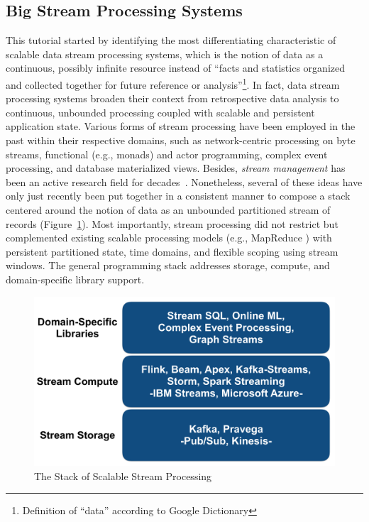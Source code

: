 
\subsection{Big Stream Processing Systems}
\label{sec:tut_systems}

This tutorial started by identifying the most differentiating characteristic of scalable data stream processing systems, which is the notion of data as a continuous, possibly infinite resource instead of ``facts and statistics organized and collected together for future reference or analysis''\footnote{Definition of ``data'' according to Google Dictionary}. In fact, data stream processing systems broaden their context from retrospective data analysis to continuous, unbounded processing coupled with scalable and persistent application state.  Various forms of stream processing have been employed in the past within their respective domains, such as network-centric processing on byte streams, functional (e.g., monads) and actor programming, complex event processing, and database materialized views. Besides, \emph{stream management} has been an active research field for decades~\cite{abadi2003aurora,arasu2004stream,chandrasekaran2003telegraphcq}. Nonetheless, several of these ideas have  only just recently been put together in a consistent manner to compose a stack  centered around the notion of data as an unbounded partitioned stream of records (Figure~\ref{fig:streamstack}). Most importantly, stream processing did not restrict but complemented existing scalable processing models (e.g., MapReduce \cite{dean2008mapreduce}) with persistent partitioned state, time domains, and flexible scoping using stream windows. The general programming stack  addresses storage, compute, and domain-specific library support.

\begin{figure}[t]
\centering
\includegraphics[width=0.4 \textwidth]{pictures/streamstack.pdf}
\caption{The Stack of Scalable Stream Processing}
\label{fig:streamstack}
\end{figure}

